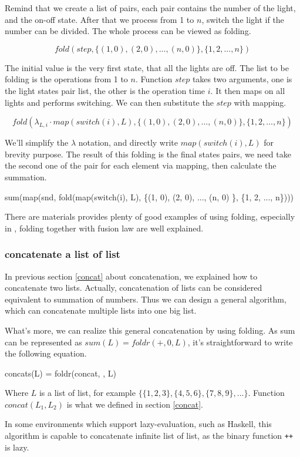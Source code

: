 \documentclass[b5paper]{article}
\begin{document}
Remind that we create a list of pairs, each pair contains the number of the light, and
the on-off state. After that we process from 1 to $n$, switch the light if the number
can be divided. The whole process can be viewed as folding.

\[
fold(step, \{(1, 0), (2, 0), ..., (n, 0) \}, \{1, 2, ..., n\})
\]

The initial value is the very first state, that all the lights are off. The list to be
folding is the operations from 1 to $n$. Function $step$ takes two arguments, one is
the light states pair list, the other is the operation time $i$. It then maps
on all lights and performs switching. We can then substitute the $step$ with mapping.

\[
fold(\lambda_{L, i} \cdot map(switch(i), L), \{(1, 0), (2, 0), ..., (n, 0) \}, \{1, 2, ..., n\})
\]

We'll simplify the $\lambda$ notation, and directly write $map(switch(i), L)$ for brevity purpose.
The result of this folding is the final states pairs, we need take the second one of the pair
for each element via mapping, then calculate the summation.

\be
sum(map(snd, fold(map(switch(i), L), \{(1, 0), (2, 0), ..., (n, 0) \}, \{1, 2, ..., n\})))
\ee

There are materials provides plenty of good examples of using folding, especially in \cite{fp-pearls},
folding together with fusion law are well explained.

\subsubsection{concatenate a list of list}
In previous section \ref{concat} about concatenation, we explained how to concatenate two lists.
Actually, concatenation of lists can be considered equivalent to summation of numbers. Thus we
can design a general algorithm, which can concatenate multiple lists into one big list.

What's more, we can realize this general concatenation by using folding. As sum can be represented
as $sum(L) = foldr(+, 0, L)$, it's straightforward to write the following equation.

\be
concats(L) = foldr(concat, \phi, L)
\ee

Where $L$ is a list of list, for example $\{\{1, 2, 3\}, \{4, 5, 6\}, \{7, 8, 9\}, ...\}$. Function
$concat(L_1, L_2)$ is what we defined in section \ref{concat}.

In some environments which support lazy-evaluation, such as Haskell, this algorithm is capable to
concatenate infinite list of list, as the binary function \texttt{++} is lazy.
\end{document}
